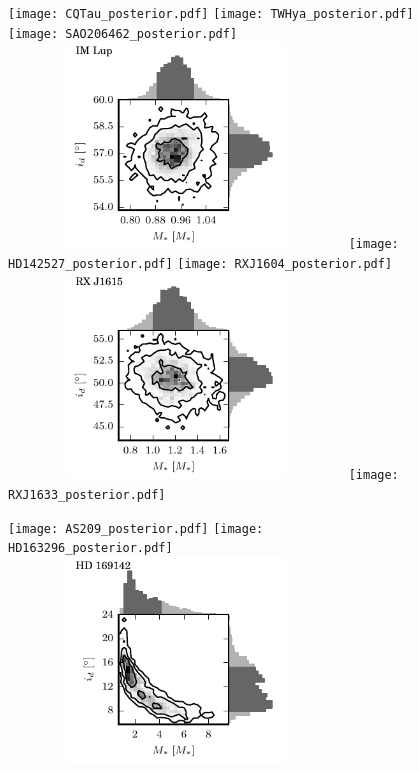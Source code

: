 \documentclass[twocolumn]{aastex6}
\begin{document}
\begin{figure}[htb]
\begin{center}
\texttt{[image: CQTau\_posterior.pdf]}
\texttt{[image: TWHya\_posterior.pdf]}
\texttt{[image: SAO206462\_posterior.pdf]}
\includegraphics[draft, width=3.5in, height=2.15in]{IMLup_posterior.pdf}
\texttt{[image: HD142527\_posterior.pdf]}
\texttt{[image: RXJ1604\_posterior.pdf]}
\includegraphics[draft, width=3.5in, height=2.15in]{RXJ1615_posterior.pdf}
\texttt{[image: RXJ1633\_posterior.pdf]}
\end{center}
\end{figure}

\begin{figure}[htb]
\begin{center}
\texttt{[image: AS209\_posterior.pdf]}
\texttt{[image: HD163296\_posterior.pdf]}
\includegraphics[draft, width=3.5in, height=2.15in]{HD169142_posterior.pdf}
\end{center}
\end{figure}
\end{document}

